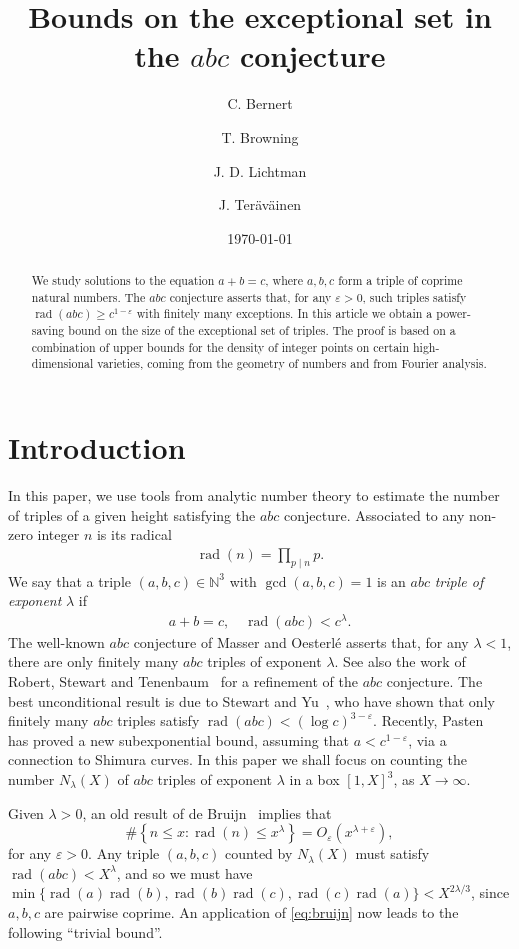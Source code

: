 \documentclass[a4paper,11pt,twoside,reqno]{amsart}
\title{Bounds on the exceptional set in the $abc$ conjecture}
\author{C. Bernert}
\author{T. Browning}
\author{J. D. Lichtman}
\author{J. Ter\"av\"ainen}
\date{\today}
\newcommand\NN{\mathbb{N}}
\renewcommand{\leq}{\leqslant}
\renewcommand{\ge}{\geqslant}
\newcommand\eps{\varepsilon}
\newcommand\ve{\varepsilon}
\theoremstyle{plain}
\theoremstyle{remark}
\DeclareMathOperator\rad{rad}
\numberwithin{prop}{section}
\numberwithin{equation}{section}
\begin{document}
\begin{abstract}
We study solutions to the equation $a+b=c$, where $a,b,c$ form a triple of coprime natural numbers.
The $abc$ conjecture asserts that, for any $\ve>0$, such triples satisfy $\rad(abc) \ge c^{1-\ve}$ with finitely many exceptions. 
In this article we obtain a power-saving bound on the size of the exceptional set of triples. 
The proof is based on a combination of upper bounds for the density of integer points on certain high-dimensional varieties,  
coming from the geometry of numbers and from Fourier analysis.
\end{abstract}


\maketitle

\setcounter{tocdepth}{1}
\tableofcontents

\section{Introduction}

In this paper, we use tools from analytic number theory to estimate the number of triples of a given height satisfying the $abc$ conjecture.  
Associated to any non-zero  integer $n$ is its radical 
\begin{align*}
\rad(n)=\prod_{p\mid n}p.    
\end{align*}
We say that a triple $(a,b,c)\in \NN^3$
with $\gcd(a,b,c)=1$ is 
 an $abc$ \emph{triple of exponent} $\lambda$ if
\begin{align*}
a+b=c,\quad \rad(abc) < c^{\lambda}.    
\end{align*}
The well-known $abc$ conjecture of Masser and Oesterl\'e asserts that, for any $\lambda<1$, there are only finitely many $abc$ triples of exponent $\lambda$. See also the work of Robert, Stewart and Tenenbaum~\cite{tenenbaum} for a refinement of the $abc$ conjecture. 
The   best unconditional result is  due to Stewart and Yu~\cite{styu}, who  have shown that only finitely many $abc$ triples satisfy $\rad(abc) < (\log c)^{3-\eps}$. Recently, Pasten~\cite{hector} has proved a new subexponential bound, assuming that  $a<c^{1-\eps}$, via a connection to Shimura curves. 
In this paper we shall focus on counting the number $N_\lambda(X)$ of $abc$ triples of exponent $\lambda$ in a box $[1,X]^3$, as $X\to \infty$. 

Given $\lambda>0$, 
an old result of
de Bruijn~\cite{debruijn} implies that 
\begin{equation}\label{eq:bruijn}
\#\left\{n\leq x : \rad(n)\leq x^\lambda\right\}=O_\ve(x^{\lambda+\ve}),
\end{equation}
for any $\ve>0$. Any triple $(a,b,c)$ counted by 
$N_\lambda(X)$ must satisfy $\rad(abc)< X^{\lambda}$, and so 
we must have
$\min\{\rad(a)\rad(b),\rad(b)\rad(c),\rad(c)\rad(a)\}< X^{2\lambda/3}$, since $a,b,c$ are pairwise coprime.
An application of \eqref{eq:bruijn} now leads to the following ``trivial bound''.
\end{document}
